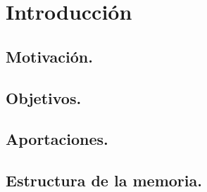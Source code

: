 \chapter{Introducción}



\section{Motivación.}



\section{Objetivos.}




\section{Aportaciones.}




\section{Estructura de la memoria.}

